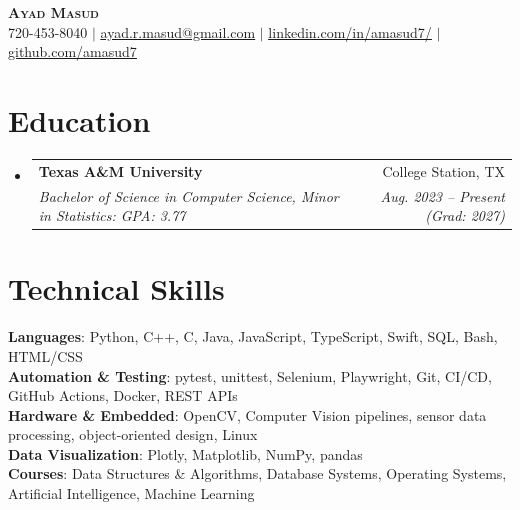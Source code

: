 \documentclass[letterpaper,10pt]{article}
\makeatletter
\newcommand{\resumeSubheading}[4]{
  \vspace{-2pt}\item
    \begin{tabular*}{0.97\textwidth}[t]{l@{\extracolsep{\fill}}r}
      \textbf{#1} & #2 \\
      \textit{\small#3} & \textit{\small #4} \\
    \end{tabular*}\vspace{-7pt}
}
\newcommand{\resumeSubHeadingListStart}{\begin{itemize}[leftmargin=0.15in, label={}, itemsep=-2pt]}
\newcommand{\resumeSubHeadingListEnd}{\end{itemize}}
\makeatother
\begin{document}

\begin{center}
    \textbf{\Huge \scshape Ayad Masud} \\ \vspace{1pt}
    \small 720-453-8040 $|$ \href{mailto:ayad.r.masud@gmail.com}{\underline{ayad.r.masud@gmail.com}} $|$ 
    \href{https://linkedin.com/in/amasud7}{\underline{linkedin.com/in/amasud7/}} $|$
    \href{https://github.com/amasud7}{\underline{github.com/amasud7}}
\end{center}


\section{Education}
  \resumeSubHeadingListStart
    \resumeSubheading
      {Texas A\&M University}{College Station, TX}
      {Bachelor of Science in Computer Science, Minor in Statistics: GPA: 3.77}{Aug. 2023 -- Present (Grad: 2027)}
  \resumeSubHeadingListEnd


\section{Technical Skills}
\begin{itemize}[leftmargin=0.15in, label={}]
   \small{\item{
    \textbf{Languages}{: Python, C++, C, Java, JavaScript, TypeScript, Swift, SQL, Bash, HTML/CSS} \\
    \textbf{Automation \& Testing}{: pytest, unittest, Selenium, Playwright, Git, CI/CD, GitHub Actions, Docker, REST APIs} \\
    \textbf{Hardware \& Embedded}{: OpenCV, Computer Vision pipelines, sensor data processing, object-oriented design, Linux} \\
    \textbf{Data Visualization}{: Plotly, Matplotlib, NumPy, pandas} \\
    \textbf{Courses}{: Data Structures \& Algorithms, Database Systems, Operating Systems, Artificial Intelligence, Machine Learning}
   }}
\end{itemize}
\end{document}
